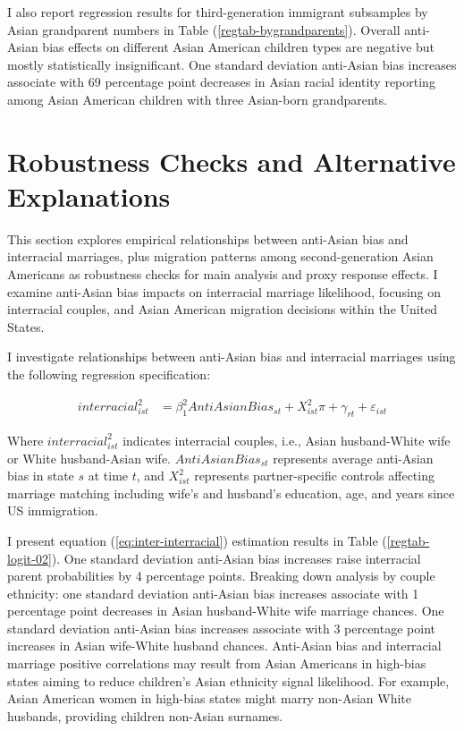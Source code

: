 I also report regression results for third-generation immigrant subsamples by Asian grandparent numbers in Table (\ref{regtab-bygrandparents}). Overall anti-Asian bias effects on different Asian American children types are negative but mostly statistically insignificant. One standard deviation anti-Asian bias increases associate with 69 percentage point decreases in Asian racial identity reporting among Asian American children with three Asian-born grandparents.

\section{Robustness Checks and Alternative Explanations}\label{sec:robcheck}

This section explores empirical relationships between anti-Asian bias and interracial marriages, plus migration patterns among second-generation Asian Americans as robustness checks for main analysis and proxy response effects. I examine anti-Asian bias impacts on interracial marriage likelihood, focusing on interracial couples, and Asian American migration decisions within the United States.

I investigate relationships between anti-Asian bias and interracial marriages using the following regression specification:

\begin{align}
interracial_{ist}^2 &= \beta_1^2 AntiAsianBias_{st} + X_{ist}^2\pi + \gamma_{rt} 
            + \varepsilon_{ist}  \label{eq:inter-interracial} 
\end{align}

Where $interracial_{ist}^2$ indicates interracial couples, i.e., Asian husband-White wife or White husband-Asian wife. $AntiAsianBias_{st}$ represents average anti-Asian bias in state $s$ at time $t$, and $X_{ist}^2$ represents partner-specific controls affecting marriage matching including wife's and husband's education, age, and years since US immigration.

I present equation (\ref{eq:inter-interracial}) estimation results in Table (\ref{regtab-logit-02}). One standard deviation anti-Asian bias increases raise interracial parent probabilities by 4 percentage points. Breaking down analysis by couple ethnicity: one standard deviation anti-Asian bias increases associate with 1 percentage point decreases in Asian husband-White wife marriage chances. One standard deviation anti-Asian bias increases associate with 3 percentage point increases in Asian wife-White husband chances. Anti-Asian bias and interracial marriage positive correlations may result from Asian Americans in high-bias states aiming to reduce children's Asian ethnicity signal likelihood. For example, Asian American women in high-bias states might marry non-Asian White husbands, providing children non-Asian surnames.

